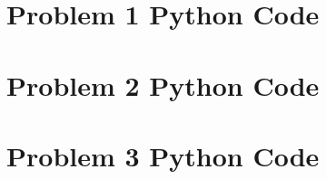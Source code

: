 \documentclass[../main.tex]{subfiles}
\begin{document}
	\begin{appendices}
		\section{Problem 1 Python Code}
		\label{Problem1Python}
		
		\newpage

		\section{Problem 2 Python Code}
		\label{Problem2Python}
		
		\newpage

		\section{Problem 3 Python Code}
		\label{Problem3Python}
		
		\newpage
	\end{appendices}
\end{document}
